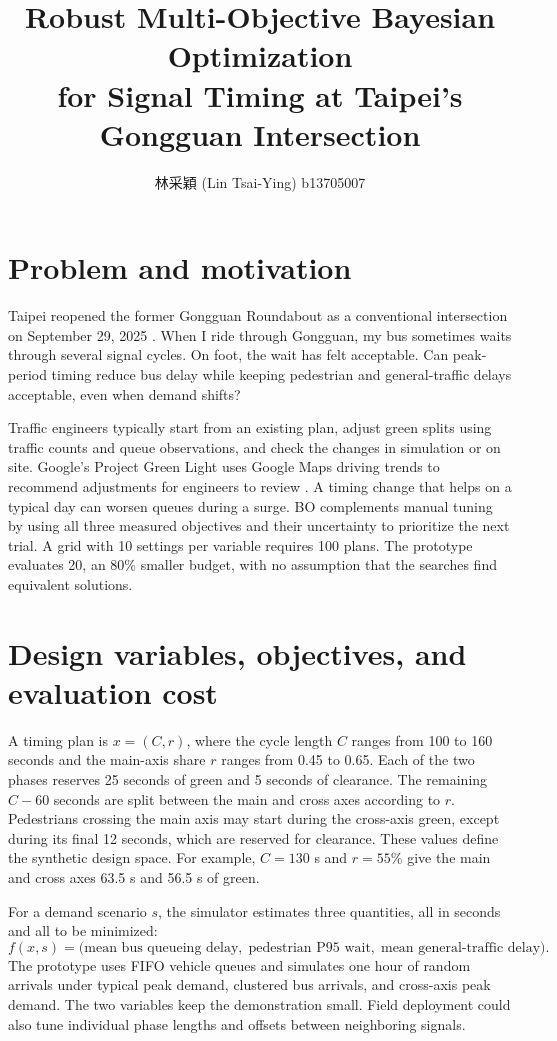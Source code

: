 \documentclass[10pt,a4paper]{article}
\title{Robust Multi-Objective Bayesian Optimization\\
for Signal Timing at Taipei's Gongguan Intersection}
\author{林采穎 (Lin Tsai-Ying) \quad b13705007\quad {\small\href{https://github.com/tsai0120/gongguan-signal-bo}{\texttt{github.com/tsai0120/gongguan-signal-bo}}}}
\date{}
\begin{document}
\maketitle
\vspace{-12mm}

\section{Problem and motivation}

Taipei reopened the former Gongguan Roundabout as a conventional intersection on September 29, 2025 \cite{taipei}. When I ride through Gongguan, my bus sometimes waits through several signal cycles. On foot, the wait has felt acceptable. Can peak-period timing reduce bus delay while keeping pedestrian and general-traffic delays acceptable, even when demand shifts?

Traffic engineers typically start from an existing plan, adjust green splits using traffic counts and queue observations, and check the changes in simulation or on site. Google's Project Green Light uses Google Maps driving trends to recommend adjustments for engineers to review \cite{greenlight}. A timing change that helps on a typical day can worsen queues during a surge. BO complements manual tuning by using all three measured objectives and their uncertainty to prioritize the next trial. A grid with 10 settings per variable requires 100 plans. The prototype evaluates 20, an 80\% smaller budget, with no assumption that the searches find equivalent solutions.

\section{Design variables, objectives, and evaluation cost}

A timing plan is $x=(C,r)$, where the cycle length $C$ ranges from 100 to
160 seconds and the main-axis share $r$ ranges from 0.45 to 0.65. Each of
the two phases reserves 25 seconds of green and 5 seconds of clearance.
The remaining $C-60$ seconds are split between the main and cross axes
according to $r$. Pedestrians crossing the main axis may start during
the cross-axis green, except during its final 12 seconds, which are
reserved for clearance. These values define the synthetic design space. For example, $C=130$ s and
$r=55\%$ give the main and cross axes 63.5 s and 56.5 s of green.

For a demand scenario $s$, the simulator estimates three quantities,
all in seconds and all to be minimized:
\[
f(x,s) = \bigl(\text{mean bus queueing delay},\;
                 \text{pedestrian P95 wait},\; \text{mean general-traffic delay}\bigr).
\]
The prototype uses FIFO vehicle queues and simulates one hour of random arrivals under typical peak demand, clustered bus arrivals, and cross-axis peak demand. The two variables keep the demonstration small. Field deployment could also tune individual phase lengths and offsets between neighboring signals.
\end{document}
